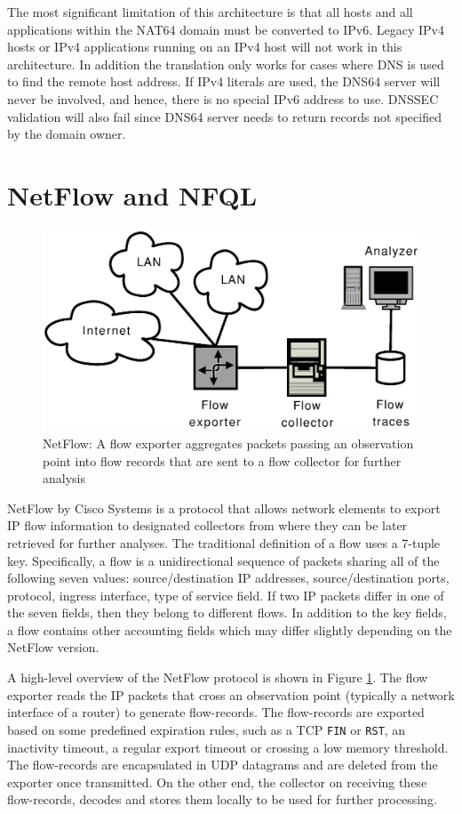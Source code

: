 \documentclass{llncs}
\begin{document}
The most significant limitation of this architecture is that all hosts and all applications within the NAT64 domain must be converted to IPv6. Legacy IPv4 hosts or IPv4 applications running on an IPv4 host will not work in this architecture. In addition the translation only works for cases where DNS is used to find the remote host address. If IPv4 literals are used, the DNS64 server will never be involved, and hence, there is no special IPv6 address to use. DNSSEC validation will also fail since DNS64 server needs to return records not specified by the domain owner.        

\section{NetFlow and NFQL}
\label{sec:netflow}

\begin{figure}[ht!]
  \centering
  \includegraphics*[width=0.65\linewidth]{netflow-overview}	
  \caption{NetFlow: A flow exporter aggregates packets passing an observation point into flow records that are sent to a flow collector for further analysis}
  \label{fig:netflow-overview}
\end{figure}
NetFlow \cite{rfc3954} by Cisco Systems is a protocol that allows network elements to export IP flow information to designated collectors from where they can be later retrieved for further analyses. The traditional definition of a flow uses a 7-tuple key. Specifically, a flow is a unidirectional sequence of packets sharing all of the following seven values: source/destination IP addresses, source/destination ports, protocol, ingress interface, type of service field. If two IP packets differ in one of the seven fields, then they belong to different flows. In addition to the key fields, a flow contains other accounting fields which may differ slightly depending on the NetFlow version.

A high-level overview of the NetFlow protocol is shown in Figure \ref{fig:netflow-overview}. The flow exporter reads the IP packets that cross an observation point (typically a network interface of a router) to generate flow-records. The flow-records are exported based on some predefined expiration rules, such as a TCP \texttt{FIN} or \texttt{RST}, an inactivity timeout, a regular export timeout or crossing a low memory threshold. The flow-records are encapsulated in UDP datagrams and are deleted from the exporter once transmitted. On the other end, the collector on receiving these flow-records, decodes and stores them locally to be used for further processing.
\end{document}
